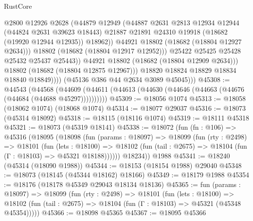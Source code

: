 \begin{lexlean}{RustCore}
\begin{coremodule}
                            @2800
                            @12926
                            @2628
                            (@44879
                              @12949
                              (@44887
                                @2631
                                @2813
                                @12934
                                @12944
                                (@44824 @2631 @39623 @18443)
                                @21887
                                @21891
                                @24310
                                @19918
                                (@18682 (@19920 @12944 @12935))
                                @18962))
                            @44921
                            @18802
                            (@18682 (@18804 @12927 @2634)))
                          @18802
                          (@18682 (@18804 @12917 @12952)))
                        @25422
                        @25425
                        @25428
                        @25432
                        @25437
                        @25443))
                    @44921
                    @18802
                    (@18682 (@18804 @12909 @2634)))
                  @18802
                  (@18682 (@18804 @12875 @12967)))
                @18820
                @18824
                @18829
                @18834
                @18840
                @18849))))
        (@45136 @386 @44 @2634 @3089 @45045)))
@45308 := @44543
    (@44568 (@44609 (@44611 (@44613 (@44630 (@44646 (@44663 (@44676 (@44684 (@44688 @45297))))))))))
@45309 := @18056 @1074
@45313 := @18058 (@18062 @1074) (@18068 @1074)
@45314 := @18077 @29037
@45316 := @18073 (@45314 @18092)
@45318 := @18115 (@18116 @1074)
@45319 := @18111 @45318
@45321 := @18073 (@45319 @18141)
@45338 := @18072
    (fun (fn : @106) =>
    @45316
      (@18095
        (@18098
          (fun (params : @18097) =>
          @18099
            (fun (rty : @2498) =>
            @18101
              (fun (lets : @18100) =>
              @18102 (fun (tail : @2675) => @18104 (fun (Γ : @18103) => @45321 @18188))))))
        @18234))
    @1988
@45341 := @18240 (@45314 (@18090 @1988))
@45344 := @18153 (@18154 @1988) @29040
@45348 := @18073 (@18145 (@45344 @18162) @18166)
@45349 := @18179 @1988
@45354 := @18176 (@18178 @45349 @29043 @18134 @18136)
@45365 := fun (params : @18097) =>
  @18099
    (fun (rty : @2498) =>
    @18101
      (fun (lets : @18100) =>
      @18102 (fun (tail : @2675) => @18104 (fun (Γ : @18103) => @45321 (@45348 @45354)))))
@45366 := @18098 @45365
@45367 := @18095 @45366

\end{coremodule}
\end{lexlean}
